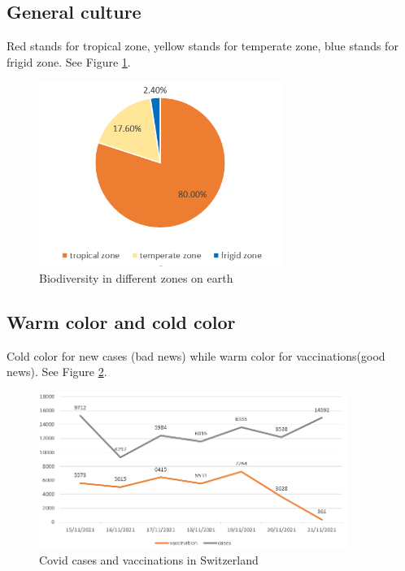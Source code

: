 \documentclass{article}
\begin{document}
\subsection{General culture}
Red stands for tropical zone, yellow stands for temperate zone, blue stands for frigid zone. See Figure \ref{Gculture}.
\begin{figure}[htbp]
    \centering
    \includegraphics[width = 8cm]{capture.PNG}
    \caption{Biodiversity in different zones on earth}
    \label{Gculture}
\end{figure}


\subsection{Warm color and cold color}
Cold color for new cases (bad news) while warm color for vaccinations(good news). See Figure \ref{color}.
\begin{figure}[htbp]
    \centering
    \includegraphics[width = 10cm]{cases.PNG}
    \caption{Covid cases and vaccinations in Switzerland}
    \label{color}
\end{figure}
\end{document}

